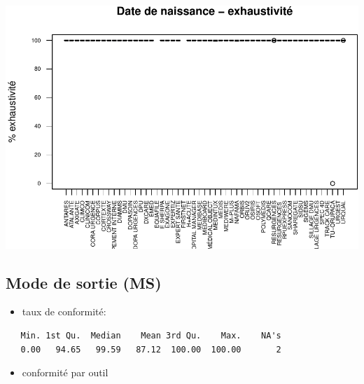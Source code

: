 \documentclass[]{article}
\begin{document}
\includegraphics{septembre2015_files/figure-latex/unnamed-chunk-19-1.pdf}

\subsection{Mode de sortie (MS)}\label{mode-de-sortie-ms}

\begin{itemize}
\itemsep1pt\parskip0pt
\item
  taux de conformité:
\end{itemize}

\begin{verbatim}
   Min. 1st Qu.  Median    Mean 3rd Qu.    Max.    NA's 
   0.00   94.65   99.59   87.12  100.00  100.00       2 
\end{verbatim}

\begin{itemize}
\itemsep1pt\parskip0pt
\item
  conformité par outil
\end{itemize}
\end{document}
